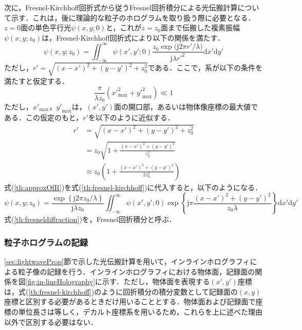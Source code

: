 次に，Fresnel-Kirchhoff回折式から従うFresnel回折積分による光伝搬計算について示す．これは，後に理論的な粒子のホログラムを取り扱う際に必要となる．$z=0$面の単色平行光$\psi(x,y;0)$と，これが$z = z_0$面まで伝搬した複素振幅$\psi(x,y;z_0)$は，Fresnel-Kirchhoff回折式により以下の関係を満たす\cite{kreis}．
\begin{equation}
    \label{th:fresnel-kirchhoff}
    \psi(x,y;z_0) = \iint_{-\infty}^{\infty} \psi(x',y';0)\frac{z_0\exp{(\mathrm{j}2\pi r' /\lambda})}{\mathrm{j}\lambda r'^2} \mathrm{d}x'\mathrm{d}y'
\end{equation}
ただし，$r'=\sqrt{(x-x')^2+(y-y')^2+z_0^2}$である．ここで，系が以下の条件を満たすと仮定する．
\begin{equation}
    \label{th:fraunhoferCondition}
    \frac{\pi }{\lambda z_0} \left( {x'}_{\mathrm{max}}^2 + {y'}_{\mathrm{max}}^2 \right) \ll 1
\end{equation}
ただし，${x'}_{\mathrm{max}}$，${y'}_{\mathrm{max}}$は，$(x',y')$面の開口部，あるいは物体像座標の最大値である．この仮定のもと，$r'$を以下のように近似する．
\begin{align}
    r' &= \sqrt{(x-x')^2+(y-y')^2+z_0^2} \\
    &= z_0 \sqrt{1 + \frac{(x-x')^2+(y-y')^2}{z_0^2}} \\
    \label{th:approxOfR}
    &\approx z_0 \left( 1 + \frac{(x-x')^2+(y-y')^2}{2z_0^2} \right)
\end{align}
式(\ref{th:approxOfR})を式(\ref{th:fresnel-kirchhoff})に代入すると，以下のようになる\cite{tyler1976}．
\begin{equation}
    \label{th:fresneldiffraction}
    \psi(x,y;z_0) = \frac{\exp{ \left\{\mathrm{j}2\pi z_0 /\lambda \right\}}}{\mathrm{j}\lambda z_0} \iint_{-\infty}^{\infty} \psi(x',y';0)\exp{\left\{ \mathrm{j}\pi \frac{(x-x')^2+(y-y')^2}{z_0\lambda} \right\}} \mathrm{d}x'\mathrm{d}y'
\end{equation}
式(\ref{th:fresneldiffraction})を，Fresnel回折積分と呼ぶ．

\subsubsection{粒子ホログラムの記録}
\ref{sec:lightwaveProp}節で示した光伝搬計算を用いて，インラインホログラフィによる粒子像の記録を行う．インラインホログラフィにおける物体面，記録面の関係を図\ref{fig:in-lineHolography}に示す．ただし，物体面を表現する$(x',y')$座標は，式(\ref{th:fresnel-kirchhoff})のように回折積分の積分変数として記録面の$(x,y)$座標と区別する必要があるときだけ用いることとする．物体面および記録面で座標の単位長さは等しく，デカルト座標系を用いるため，これらを上に述べた理由以外で区別する必要はない．


